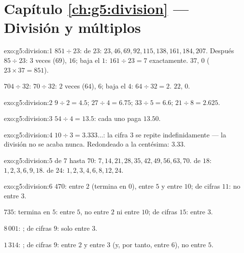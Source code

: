 \section*{Capítulo \ref{ch:g5:division} --- División y múltiplos}

\begin{solution}{exo:g5:division:1}
$851 \div 23$:  de $23$: $23, 46, 69, 92, 115, 138, 161,
184, 207$. Después $85 \div 23$: $3$ veces ($69$),  $16$;
baja el $1$: $161 \div 23 = 7$ exactamente.  $37$,
 $0$ ($23 \times 37 = 851$).

$704 \div 32$: $70 \div 32$: $2$ veces ($64$),  $6$; baja
el $4$: $64 \div 32 = 2$.  $22$,  $0$.
\end{solution}

\begin{solution}{exo:g5:division:2}
$9 \div 2 = 4.5$; \quad $27 \div 4 = 6.75$; \quad
$33 \div 5 = 6.6$; \quad $21 \div 8 = 2.625$.
\end{solution}

\begin{solution}{exo:g5:division:3}
$54 \div 4 = 13.5$: cada uno paga $13.50$.
\end{solution}

\begin{solution}{exo:g5:division:4}
$10 \div 3 = 3.333\dots$: la cifra $3$ se repite indefinidamente --- la
división no se acaba nunca. Redondeado a la centésima: $3.33$.
\end{solution}

\begin{solution}{exo:g5:division:5}
 de $7$ hasta $70$: $7, 14, 21, 28, 35, 42, 49, 56, 63,
70$.  de $18$: $1, 2, 3, 6, 9, 18$.  de $24$:
$1, 2, 3, 4, 6, 8, 12, 24$.
\end{solution}

\begin{solution}{exo:g5:division:6}
$470$: entre $2$ (termina en $0$), entre $5$ y entre $10$;  de cifras $11$: no entre
$3$.

$735$: termina en $5$: entre $5$, no entre $2$ ni entre $10$;  de cifras $15$: entre
$3$.

$8\,001$: ;  de cifras $9$: solo entre $3$.

$1\,314$: ;  de cifras $9$: entre $2$ y entre $3$ (y, por tanto, entre $6$),
no entre $5$.
\end{solution}

